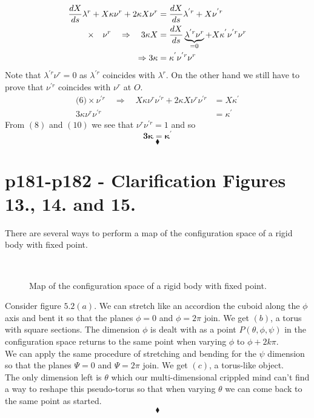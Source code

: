 \begin{align}
\dv{X}{s}\lambda^r +X\kappa\nu^r+ 2\kappa X \nu^r&= \dv{X}{s}\lambda^{'r}+X \nu^{'r}\\
\times \quad\nu^r\quad\Rightarrow\quad3\kappa X &= \dv{X}{s}\underbrace{\lambda^{'r}\nu^r}_{=0}+X \kappa^{'}\nu^{'r}\nu^r\\
\Rightarrow 3\kappa&=\kappa^{'}\nu^{'r}\nu^r
\end{align}
Note that $\lambda^{'r}\nu^r=0$ as $\lambda^{'r}$ coincides with $\lambda^{r}$. On the other hand we still have to prove that $\nu^{'r}$ coincides with $\nu^{r}$ at $O$.
\begin{align}
\text{(6)}\times \nu^{'r}\quad\Rightarrow\quad X\kappa\nu^r\nu^{'r}+2\kappa X \nu^r\nu^{'r}&= X\kappa^{'}\\
3\kappa\nu^r\nu^{'r}&=\kappa^{'}
\end{align}
From $(8)$ and $(10)$ we see that $\nu^r\nu^{'r}=1$ and so 
$$\mathbf{3\kappa=\kappa^{'}}$$
$$\blacklozenge$$
\newpage


\section{p181-p182 - Clarification Figures 13., 14. and 15.}
\begin{tcolorbox}
There are several ways to perform  a map of the configuration space of a rigid body with fixed point.
\end{tcolorbox}
\begin{figure}[H]
    \centering
    \subfloat[]{}
	\
    \subfloat[]{}
    \qquad
    \subfloat[]{}
\caption{Map of the configuration space of a rigid body with fixed point.}
\label{fig:fig_p181}
\end{figure}
Consider figure $5.2 (a)$. We can stretch like an accordion the cuboid along the $\phi$ axis and bent it so that the planes $\phi=0$ and $\phi=2\pi$ join. We get $(b)$,  a torus with square sections. The dimension $\phi$ is dealt with as a point $P\left( \theta, \phi, \psi \right)$ in the configuration space  returns to the same point when varying $\phi$ to $\phi+2k\pi$.\\
We can apply the same procedure of stretching and bending for the $\psi$ dimension so that the planes $\Psi=0$ and $\Psi=2\pi$ join.
We get $(c)$,  a torus-like object.\\
The only dimension left is $\theta$ which our multi-dimensional crippled mind can't find a way to reshape this pseudo-torus so that when varying $\theta$ we can come back to the same point as started.
$$\blacklozenge$$
\newpage




